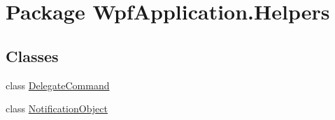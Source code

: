 \hypertarget{namespace_wpf_application_1_1_helpers}{\section{Package Wpf\-Application.\-Helpers}
\label{namespace_wpf_application_1_1_helpers}
}
\subsection*{Classes}
\begin{DoxyCompactItemize}
\item 
class \hyperlink{class_wpf_application_1_1_helpers_1_1_delegate_command}{Delegate\-Command}
\item 
class \hyperlink{class_wpf_application_1_1_helpers_1_1_notification_object}{Notification\-Object}
\end{DoxyCompactItemize}
